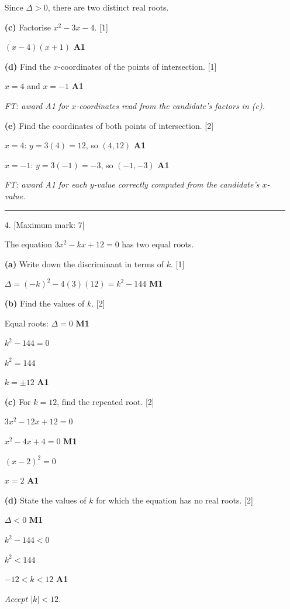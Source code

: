 \documentclass[12pt, twoside]{article}
\begin{document}
\begin{enumerate}[itemsep=0.3cm]
Since $\Delta > 0$, there are two distinct real roots.

\medskip

\textbf{(c)} Factorise $x^2 - 3x - 4$. \hfill [1]

$(x - 4)(x + 1)$ \hfill \textbf{A1}

\medskip

\textbf{(d)} Find the $x$-coordinates of the points
of intersection. \hfill [1]

$x = 4$ and $x = -1$ \hfill \textbf{A1}

\emph{FT: award A1 for $x$-coordinates read from the candidate's factors in (c).}

\medskip

\textbf{(e)} Find the coordinates of both points
of intersection. \hfill [2]

$x = 4$: $y = 3(4) = 12$, so $(4, 12)$ \hfill \textbf{A1}

$x = -1$: $y = 3(-1) = -3$, so $(-1, -3)$ \hfill \textbf{A1}

\emph{FT: award A1 for each $y$-value correctly computed from the candidate's $x$-value.}

\bigskip
\hrule
\bigskip

\item[4.] [Maximum mark: 7]

The equation $3x^2 - kx + 12 = 0$ has two equal roots.

\medskip

\textbf{(a)} Write down the discriminant in terms of $k$. \hfill [1]

$\Delta = (-k)^2 - 4(3)(12) = k^2 - 144$ \hfill \textbf{M1}

\medskip

\textbf{(b)} Find the values of $k$. \hfill [2]

Equal roots: $\Delta = 0$ \hfill \textbf{M1}

$k^2 - 144 = 0$

$k^2 = 144$

$k = \pm 12$ \hfill \textbf{A1}

\medskip

\textbf{(c)} For $k = 12$, find the repeated root. \hfill [2]

$3x^2 - 12x + 12 = 0$

$x^2 - 4x + 4 = 0$ \hfill \textbf{M1}

$(x - 2)^2 = 0$

$x = 2$ \hfill \textbf{A1}

\medskip

\textbf{(d)} State the values of $k$ for which the equation
has no real roots. \hfill [2]

$\Delta < 0$ \hfill \textbf{M1}

$k^2 - 144 < 0$

$k^2 < 144$

$-12 < k < 12$ \hfill \textbf{A1}

\emph{Accept $|k| < 12$.}

\end{enumerate}
\end{document}
